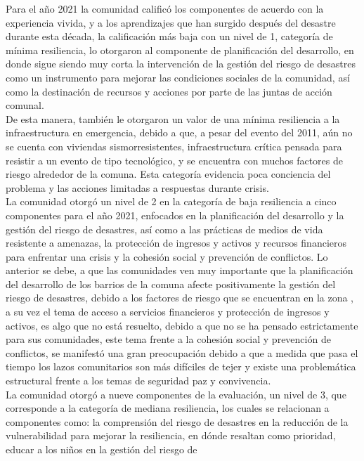 \documentclass[
  letterpaper,
]{book}
\begin{document}
Para el año 2021 la comunidad calificó los componentes de acuerdo con la
experiencia vivida, y a los aprendizajes que han surgido después del
desastre durante esta década, la calificación más baja con un nivel de
1, categoría de mínima resiliencia, lo otorgaron al componente de
planificación del desarrollo, en donde sigue siendo muy corta la
intervención de la gestión del riesgo de desastres como un instrumento
para mejorar las condiciones sociales de la comunidad, así como la
destinación de recursos y acciones por parte de las juntas de acción
comunal.\\
De esta manera, también le otorgaron un valor de una mínima resiliencia
a la infraestructura en emergencia, debido a que, a pesar del evento del
2011, aún no se cuenta con viviendas sismorresistentes, infraestructura
crítica pensada para resistir a un evento de tipo tecnológico, y se
encuentra con muchos factores de riesgo alrededor de la comuna. Esta
categoría evidencia poca conciencia del problema y las acciones
limitadas a respuestas durante crisis.\\
La comunidad otorgó un nivel de 2 en la categoría de baja resiliencia a
cinco componentes para el año 2021, enfocados en la planificación del
desarrollo y la gestión del riesgo de desastres, así como a las
prácticas de medios de vida resistente a amenazas, la protección de
ingresos y activos y recursos financieros para enfrentar una crisis y la
cohesión social y prevención de conflictos. Lo anterior se debe, a que
las comunidades ven muy importante que la planificación del desarrollo
de los barrios de la comuna afecte positivamente la gestión del riesgo
de desastres, debido a los factores de riesgo que se encuentran en la
zona , a su vez el tema de acceso a servicios financieros y protección
de ingresos y activos, es algo que no está resuelto, debido a que no se
ha pensado estrictamente para sus comunidades, este tema frente a la
cohesión social y prevención de conflictos, se manifestó una gran
preocupación debido a que a medida que pasa el tiempo los lazos
comunitarios son más difíciles de tejer y existe una problemática
estructural frente a los temas de seguridad paz y convivencia.\\
La comunidad otorgó a nueve componentes de la evaluación, un nivel de 3,
que corresponde a la categoría de mediana resiliencia, los cuales se
relacionan a componentes como: la comprensión del riesgo de desastres en
la reducción de la vulnerabilidad para mejorar la resiliencia, en dónde
resaltan como prioridad, educar a los niños en la gestión del riesgo de
\end{document}
